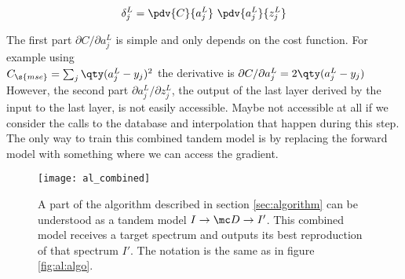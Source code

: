 \begin{equation}
    \delta^L_j = \pdv{C}{a^L_j} \ \pdv{a^L_j}{z^L_j}
\end{equation}

The first part $\partial C / \partial{a^L_j}$ is simple and only depends on the cost function. For example using \\
$C_\s{mse} = \sum_j \qty(a_j^L - y_j)^2$
the derivative is 
$\partial{C} / \partial{a^L_j} = 2 \qty(a_j^L - y_j)$
However, the second part 
$\partial{a^L_j} / \partial{z^L_j}$,
the output of the last layer derived by the input to the last layer, is not easily accessible. Maybe not accessible at all if we consider the calls to the database and interpolation that happen during this step. The only way to train this combined tandem model is by replacing the forward model with something where we can access the gradient.

\begin{figure}[H]
    \centering
    \texttt{[image: al\_combined]}
    \caption{A part of the algorithm described in section \ref{sec:algorithm} can be understood as a tandem model 
    $I \rightarrow \mc D \rightarrow I'$.
    This combined model receives a target spectrum and outputs its best reproduction of that spectrum $I'$. The notation is the same as in figure \ref{fig:al:algo}.}
    \label{fig:al:combined}
\end{figure}